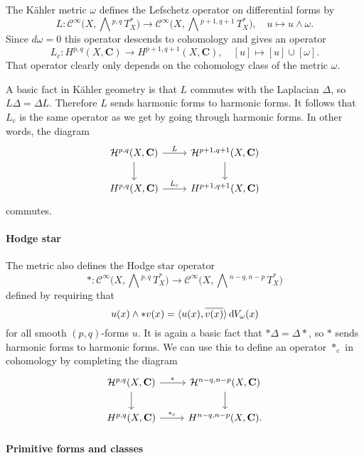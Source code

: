 \documentclass[11pt]{article}
\theoremstyle{definition}
\newcommand{\cc}[1]{\mathcal{#1}}
\def\ov#1{\overline{#1}}
\def\<{\langle}
\def\>{\rangle}
\def\bw#1{\bigwedge\!\!{}^{#1}\, T_X^*}
\def\CC{\mathbf{C}}
\def\HH{\mathcal{H}}
\def\dV{\mathrm{d}\mkern-1mu V}
\begin{document}
The K\"ahler metric $\omega$ defines the Lefschetz operator on differential forms by
\[
L : \cc C^\infty\bigl(X, \bw {p,q}\bigr) \to \cc C^\infty\bigl(X, \bw{p+1,q+1}\bigr),
\quad
u \mapsto u \wedge \omega.
\]
Since $d\omega = 0$ this operator descends to cohomology and gives an operator
\[
L_c : H^{p,q}(X,\CC) \to H^{p+1,q+1}(X,\CC),
\quad
[u] \mapsto [u] \cup [\omega].
\]
That operator clearly only depends on the cohomology class of the metric $\omega$.

A basic fact in K\"ahler geometry is that $L$ commutes with the Laplacian $\Delta$, so $L\Delta = \Delta L$.
Therefore $L$ sends harmonic forms to harmonic forms.
It follows that $L_c$ is the same operator as we get by going through harmonic forms.
In other words, the diagram
\[
\begin{tikzcd}
\HH^{p,q}(X,\CC) \ar[r,"L"] \ar[d] & \HH^{p+1,q+1}(X,\CC) \ar[d]
\\
H^{p,q}(X,\CC) \ar[r,"L_c"] & H^{p+1,q+1}(X,\CC)
\end{tikzcd}
\]
commutes.


\paragraph{Hodge star}

The metric also defines the Hodge star operator
\[
* : \cc C^\infty\bigl(X, \bw {p,q}\bigr) \to \cc C^\infty\bigl(X, \bw{n-q,n-p}\bigr)
\]
defined by requiring that
\[
u(x) \wedge *v(x)
= \< u(x), \ov{v(x)} \> \, \dV_\omega(x)
\]
for all smooth $(p,q)$-forms $u$.
It is again a basic fact that $* \Delta = \Delta *$, so $*$ sends harmonic forms to harmonic forms.
We can use this to define an operator $*_c$ in cohomology by completing the diagram
\[
\begin{tikzcd}
\HH^{p,q}(X,\CC) \ar[r,"*"] \ar[d] & \HH^{n-q,n-p}(X,\CC) \ar[d]
\\
H^{p,q}(X,\CC) \ar[r,"*_c"] & H^{n-q,n-p}(X,\CC).
\end{tikzcd}
\]


\paragraph{Primitive forms and classes}
\end{document}

